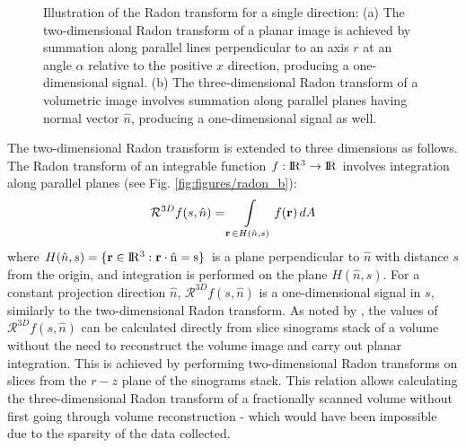 \begin{figure}[t]
  \centering
  \hfill
  \caption{\small{Illustration of the Radon transform for a single direction: (a) The two-dimensional Radon transform of a planar image is achieved by summation along parallel lines perpendicular to an axis $r$ at an angle $\alpha$ relative to the positive $x$ direction, producing a one-dimensional signal. (b) The three-dimensional Radon transform of a volumetric image involves summation along parallel planes having normal vector $\hat{n}$, producing a one-dimensional signal as well.}}
    \label{fig:figures/radon}
\end{figure}


 The two-dimensional Radon transform is extended to three dimensions as follows. The Radon transform of an integrable function $f: \rm I\!R ^3 \rightarrow \rm I\!R $ involves integration along parallel planes (see Fig. \ref{fig:figures/radon_b}):
 \begin{equation}
    \mathcal{R}^{3D} f(s, \hat{n}) 
    = \int \displaylimits_{\textbf{r}\, \in H(\hat{n}, s)} f(\textbf{r})\, dA
 \end{equation}
 where $H(\hat{n}, s) = \{ \textbf{r} \in \rm I\!R ^3 : \textbf{r} \cdot \hat{n} = s\}$ is a plane perpendicular to $\hat{n}$ with distance $s$ from the origin, and integration is performed on the plane $H(\hat{n}, s)$. For a constant projection direction $\hat{n}$, $\mathcal{R}^{3D} f(s, \hat{n})$ is a one-dimensional signal in $s$, similarly to the two-dimensional Radon transform. As noted by \cite{mooser2013estimation}, the values of $\mathcal{R}^{3D} f(s, \hat{n})$ can be calculated directly from slice sinograms stack of a volume without the need to reconstruct the volume image and carry out planar integration. This is achieved by performing two-dimensional Radon transforms on slices from the $r-z$ plane of the sinograms stack. This relation allows calculating the three-dimensional Radon transform of a fractionally scanned volume without first going through volume reconstruction - which would have been impossible due to the sparsity of the data collected.

